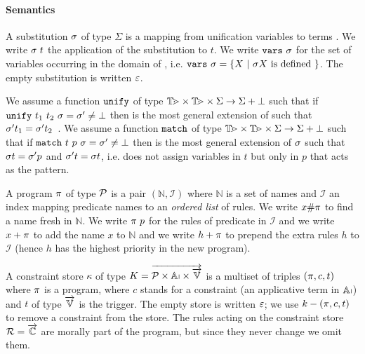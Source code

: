 \documentclass[a4paper, 11pt]{book}
\begin{document}
\newcommand{\unifyCmd}[5][]{\ensuremath{
  \ifstrequal{#1}{1}
    {\vecL{\unify\ #2\ #3}}
    {\unify\ #2\ #3}\ #4 = #5}}
\newcommand{\matchCmd}[5][]{\ensuremath{
  \ifstrequal{#1}{1}
  {\vecL{\match\ #2\ #3}}
  {\match\ #2\ #3}\ #4 = #5}}

\paragraph{Semantics}

A substitution $\subst$ of type $\Sigma$
is a mapping from unification variables
\VAR to terms \TERM{}. %
We write
$\subst\ t$ the  application of the substitution to $t$.
We write $\dom\ \subst$ for the set of variables occurring
in the domain %
of \subst, i.e.
$\dom\ \subst = \{ X\ |\ \subst X \mathrm{\ is\ defined\ }\}$. %
The empty substitution is written $\EmptySubst$. %

We assume a function $\unify$ of type $\TERM \times \TERM \times \Sigma \to \Sigma + \bot$
such that if $\unifyCmd{t_1}{t_2}{\subst}{\subst[']} \not= \bot$ 
then \subst['] is the most general extension of \subst 
such that $\subst['] t_1 = \subst['] t_2$~\cite{miller92jsc}.
We assume a function $\match$ of type $\TERM \times \TERM \times \Sigma \to \Sigma + \bot$
such that if $\matchCmd{t}{p}{\subst}{\subst[']} \not= \bot$
then \subst[']  is the most general extension of  $\subst$
such that $\subst t = \subst['] p$ and $\subst[']t = \subst t$,
i.e. \match{} does not assign variables in $t$ but only in $p$ that acts as the pattern.

A program $\prog$ of type $\PROG$ is a pair $(\mathbb{N}, \mathcal{I})$
where $\mathbb{N}$ is a set of names and $\mathcal{I}$ an index
mapping predicate names to an \emph{ordered list} of rules.
We write $x \# \prog$ to find a name fresh in $\mathbb{N}$.
We write $\prog~\pred$ for the rules of predicate \pred in $\mathcal{I}$
and we write $x + \prog$ to add the name $x$ to $\mathbb{N}$
and we write $h + \prog$ to prepend the extra rules $h$  to $\mathcal{I}$
(hence $h$ has the highest priority in the new program).


A constraint store $\kappa$ of type $K = \vecL{\PROG \times \APP \times \vecL{\VAR}}$
is a multiset of triples $(\prog,c,t)$
where $\prog$ is a program, where $c$ stands for a constraint (an applicative term in $\APP$) and $t$
of type $\vecL{\VAR}$ is the trigger. The empty store is written $\EmptySubst$;
we use $k - (\prog,c,t)$ to remove a constraint from the store.
The rules acting on the constraint store $\mathcal{R = \vecL{\mathbb{C}}}$ are
morally part of the program, but since they never change we omit them.
\end{document}
